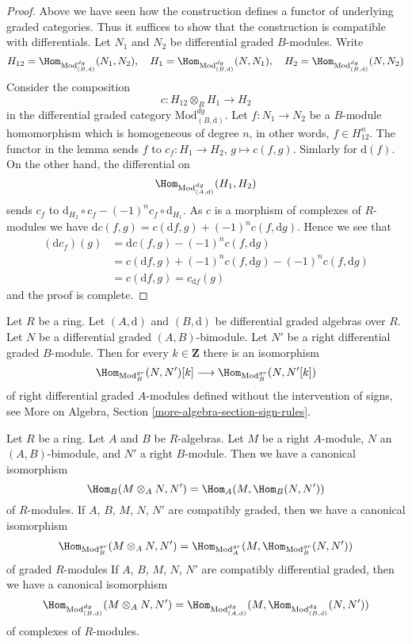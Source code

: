 \begin{proof}
Above we have seen how the construction defines a functor of underlying
graded categories. Thus it suffices to show that the construction is
compatible with differentials. Let $N_1$ and $N_2$ be differential
graded $B$-modules. Write
$$
H_{12} = \Hom_{\text{Mod}^{dg}_{(B, \text{d})}}(N_1, N_2),\quad
H_1 = \Hom_{\text{Mod}^{dg}_{(B, \text{d})}}(N, N_1),\quad
H_2 = \Hom_{\text{Mod}^{dg}_{(B, \text{d})}}(N, N_2)
$$
Consider the composition
$$
c : H_{12} \otimes_R H_1 \longrightarrow H_2
$$
in the differential graded category $\text{Mod}^{dg}_{(B, \text{d})}$.
Let $f : N_1 \to N_2$ be a $B$-module homomorphism which is homogeneous
of degree $n$, in other words, $f \in H_{12}^n$.
The functor in the lemma sends $f$ to $c_f : H_1 \to H_2$, $g \mapsto c(f, g)$.
Simlarly for $\text{d}(f)$. On the other hand, the differential on
$$
\Hom_{\text{Mod}^{dg}_{(A, \text{d})}}(H_1, H_2)
$$
sends $c_f$ to $\text{d}_{H_2} \circ c_f - (-1)^n c_f \circ \text{d}_{H_1}$.
As $c$ is a morphism of complexes of $R$-modules we have
$\text{d} c(f, g) = c(\text{d}f, g) + (-1)^n c(f, \text{d}g)$.
Hence we see that
\begin{align*}
(\text{d}c_f)(g)
& =
\text{d}c(f,g) - (-1)^n c(f, \text{d}g) \\
& =
c(\text{d}f, g) + (-1)^n c(f, \text{d}g)  - (-1)^n c(f, \text{d}g) \\
& =
c(\text{d}f, g) = c_{\text{d}f}(g)
\end{align*}
and the proof is complete.
\end{proof}

\begin{remark}
\label{remark-shift-hom-no-sign}
Let $R$ be a ring. Let $(A, \text{d})$ and $(B, \text{d})$
be differential graded algebras over $R$. Let $N$ be a
differential graded $(A, B)$-bimodule. Let $N'$ be a right differential
graded $B$-module. Then for every $k \in \mathbf{Z}$ there
is an isomorphism
$$
\Hom_{\text{Mod}^{gr}_B}(N, N')[k]
\longrightarrow
\Hom_{\text{Mod}^{gr}_B}(N, N'[k])
$$
of right differential graded $A$-modules defined without the intervention
of signs, see More on Algebra, Section \ref{more-algebra-section-sign-rules}.
\end{remark}

\begin{lemma}
\label{lemma-tensor-hom-adjunction}
Let $R$ be a ring. Let $A$ and $B$ be $R$-algebras.
Let $M$ be a right $A$-module, $N$ an $(A, B)$-bimodule, and
$N'$ a right $B$-module. Then we have a canonical isomorphism
$$
\Hom_B(M \otimes_A N, N') = \Hom_A(M, \Hom_B(N, N'))
$$
of $R$-modules.
If $A$, $B$, $M$, $N$, $N'$ are compatibly graded, then we have a
canonical isomorphism
$$
\Hom_{\text{Mod}_B^{gr}}(M \otimes_A N, N') =
\Hom_{\text{Mod}_A^{gr}}(M, \Hom_{\text{Mod}_B^{gr}}(N, N'))
$$
of graded $R$-modules
If $A$, $B$, $M$, $N$, $N'$ are compatibly differential graded, then
we have a canonical isomorphism
$$
\Hom_{\text{Mod}^{dg}_{(B, \text{d})}}(M \otimes_A N, N') =
\Hom_{\text{Mod}^{dg}_{(A, \text{d})}}(M,
\Hom_{\text{Mod}^{dg}_{(B, \text{d})}}(N, N'))
$$
of complexes of $R$-modules.
\end{lemma}

